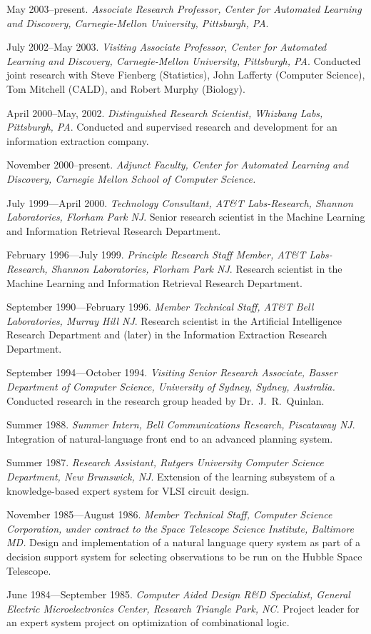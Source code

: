 \bi
\item May 2003--present. {\it Associate Research Professor, Center for 
Automated Learning and Discovery, Carnegie-Mellon University,
Pittsburgh, PA}. 
\item July 2002--May 2003. {\it Visiting Associate Professor, Center for 
Automated Learning and Discovery, Carnegie-Mellon University,
Pittsburgh, PA}.  Conducted joint research with Steve Fienberg
(Statistics), John Lafferty (Computer Science), Tom Mitchell (CALD),
and Robert Murphy (Biology).
\item April 2000--May, 2002. {\it Distinguished Research Scientist,
Whizbang Labs, Pittsburgh, PA}. Conducted and supervised research and
development for an information extraction company.
\item November 2000--present. {\it Adjunct Faculty, Center for Automated
Learning and Discovery, Carnegie Mellon School of Computer Science.}
\item July 1999---April 2000. {\it Technology Consultant, AT\&T
Labs-Research, Shannon Laboratories, Florham Park NJ}. Senior research
scientist in the Machine Learning and Information Retrieval Research
Department. 
\item February 1996---July 1999. {\it Principle Research Staff Member,
AT\&T Labs-Research, Shannon Laboratories, Florham Park NJ}. Research
scientist in the Machine Learning and Information Retrieval Research
Department.
\item September 1990---February 1996. {\it Member Technical Staff, AT\&T Bell
Laboratories, Murray Hill NJ}. Research scientist in the Artificial
Intelligence Research Department and (later) in the
Information Extraction Research Department.
\item September 1994---October 1994. {\it Visiting Senior Research Associate,
Basser Department of Computer Science, University of Sydney, Sydney,
Australia.}  Conducted research in the research group
headed by Dr.~J.~R.~Quinlan.
\item Summer 1988. {\it Summer Intern, Bell Communications
Research, Piscataway NJ}.  Integration of natural-language front end
to an advanced planning system.
\item Summer 1987. {\it Research Assistant, Rutgers University
Computer Science Department, New Brunswick, NJ}. Extension of the
learning subsystem of a knowledge-based expert system for VLSI circuit
design.
\item November 1985---August 1986. {\it Member Technical Staff,
Computer Science Corporation, under contract to the Space Telescope
Science Institute, Baltimore MD.} Design and implementation of a
natural language query system as part of a decision support system for
selecting observations to be run on the Hubble Space Telescope.
\item June 1984---September 1985. {\it Computer Aided Design R\&D Specialist, 
General Electric Microelectronics Center, Research Triangle Park, NC.}
Project leader for an expert system project on optimization of
combinational logic.
\ei

